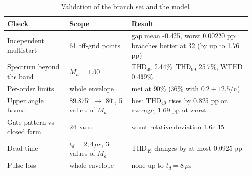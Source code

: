 \begin{table}[!t]
\centering
\caption{Validation of the branch set and the model.}
\label{tab:validation}
\footnotesize
\setlength{\tabcolsep}{4pt}
\begin{tabular}{p{}p{}p{}}
\toprule
Check & Scope & Result \\
\midrule
Independent multistart & 61 off-grid points & gap mean -0.425, worst 0.00220 pp; branches better at 32 (by up to 1.76 pp) \\
Spectrum beyond the band & $M_a = 1.00$ & THD$_{49}$ 2.44\%, THD$_{99}$ 25.7\%, WTHD 0.499\% \\
Per-order limits & whole envelope & met at 90\% (36\% with $0.2+12.5/n$) \\
Upper angle bound & 89.875$^\circ$ $\rightarrow$ 80$^\circ$, 5 values of $M_a$ & best THD$_{49}$ rises by 0.825 pp on average, 1.69 pp at worst \\
Gate pattern vs closed form & 24 cases & worst relative deviation 1.6e-15 \\
Dead time & $t_d = 2, 4\,\mu$s, 3 values of $M_a$ & THD$_{49}$ changes by at most 0.0925 pp \\
Pulse loss & whole envelope & none up to $t_d = 8\,\mu$s \\
\bottomrule
\end{tabular}
\end{table}
